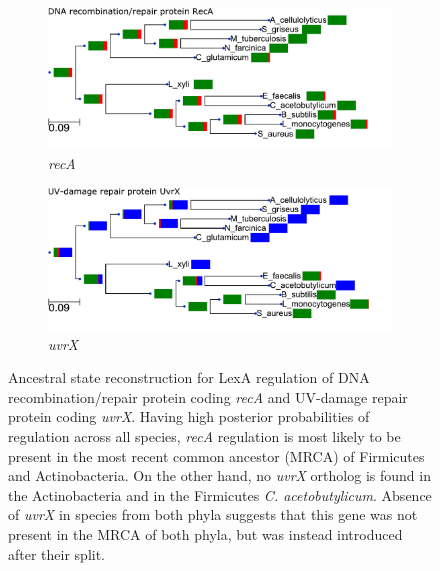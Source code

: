 \begin{figure}
  \centering
  \begin{subfigure}{0.49\textwidth}
    \includegraphics[width=\textwidth]{figures/chapter4/recA_ASR}
    \caption{\textit{recA}}
    \label{fig:ASR-a}
  \end{subfigure}
  \begin{subfigure}{0.49\textwidth}
    \includegraphics[width=\textwidth]{figures/chapter4/uvrX_ASR}
    \caption{\textit{uvrX}}
    \label{fig:ASR-b}
  \end{subfigure}
  \caption[Ancestral state reconstruction for LexA regulation of DNA
  recombination/repair protein coding \textit{recA} and UV-damage repair
  protein coding \textit{uvrX}.]{Ancestral state reconstruction for LexA
    regulation of DNA recombination/repair protein coding \textit{recA} and
    UV-damage repair protein coding \textit{uvrX}. Having high posterior
    probabilities of regulation across all species, \textit{recA} regulation is
    most likely to be present in the most recent common ancestor (MRCA) of
    Firmicutes and Actinobacteria. On the other hand, no \textit{uvrX} ortholog
    is found in the Actinobacteria and in the Firmicutes
    \textit{C. acetobutylicum}. Absence of \textit{uvrX} in species from both
    phyla suggests that this gene was not present in the MRCA of both phyla,
    but was instead introduced after their split.}
  \label{fig:ASR}
 \end{figure}


